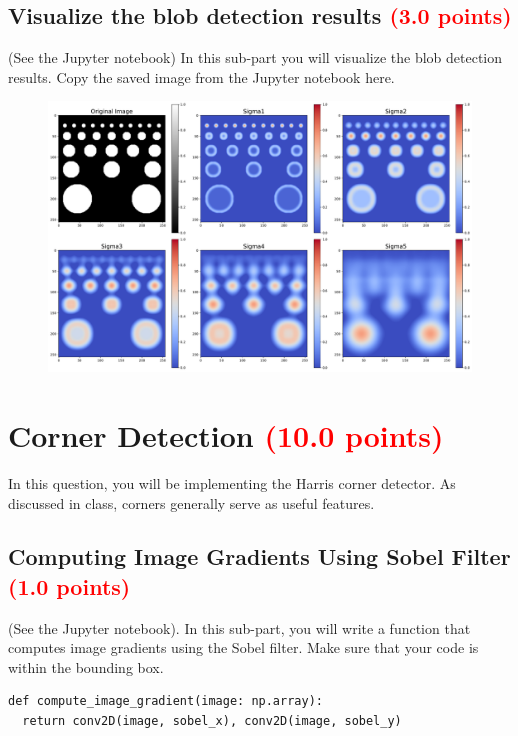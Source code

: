 \documentclass[answers]{exam}
\newcommand{\mypoints}[1]{\textcolor{red}{(#1 points)}}
\begin{document}
\subsection{Visualize the blob detection results \mypoints{3.0}}
(See the Jupyter notebook) In this sub-part you will visualize the blob detection results. Copy the saved image from the Jupyter notebook here. 
\begin{solution}
\begin{figure}[H]
    \centering
    \includegraphics[width=1.0\linewidth]{Images/question_2_8.pdf}
\end{figure}
\end{solution}

\newpage
\section{Corner Detection \mypoints{10.0}}

In this question, you will be implementing the Harris corner detector. As discussed in class, corners generally serve as useful features.

\subsection{Computing Image Gradients Using Sobel Filter \mypoints{1.0}}
(See the Jupyter notebook). In this sub-part, you will write a function that computes image gradients using the Sobel filter. Make sure that your code is within the bounding box.

\begin{solution}
\begin{verbatim}
def compute_image_gradient(image: np.array):
  return conv2D(image, sobel_x), conv2D(image, sobel_y)
\end{verbatim}
\end{solution}
\end{document}
